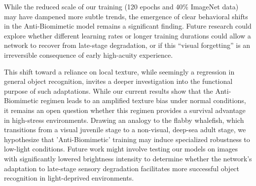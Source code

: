 While the reduced scale of our training (120 epochs and 40\% ImageNet data) may have dampened more subtle trends, the emergence of clear behavioral shifts in the Anti-Biomimetic model remains a significant finding. Future research could explore whether different learning rates or longer training durations could allow a network to recover from late-stage degradation, or if this ``visual forgetting'' is an irreversible consequence of early high-acuity experience.

This shift toward a reliance on local texture, while seemingly a regression in general object recognition, invites a deeper investigation into the functional purpose of such adaptations. While our current results show that the Anti-Biomimetic regimen leads to an amplified texture bias under normal conditions, it remains an open question whether this regimen provides a survival advantage in high-stress environments. Drawing an analogy to the flabby whalefish, which transitions from a visual juvenile stage to a non-visual, deep-sea adult stage, we hypothesize that 'Anti-Biomimetic' training may induce specialized robustness to low-light conditions. Future work might involve testing our models on images with significantly lowered brightness intensity to determine whether the network's adaptation to late-stage sensory degradation facilitates more successful object recognition in light-deprived environments.
